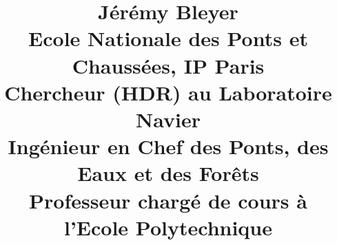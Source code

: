 \documentclass[english,11pt]{article}
\begin{document}
\title{
\Large Jérémy Bleyer\\
\large Ecole Nationale des Ponts et Chaussées, IP Paris\\
Chercheur (HDR) au Laboratoire Navier\\
Ingénieur en Chef des Ponts, des Eaux et des Forêts\\
Professeur chargé de cours à l'Ecole Polytechnique
}

\maketitle
\thispagestyle{firststyle}





\end{document}
